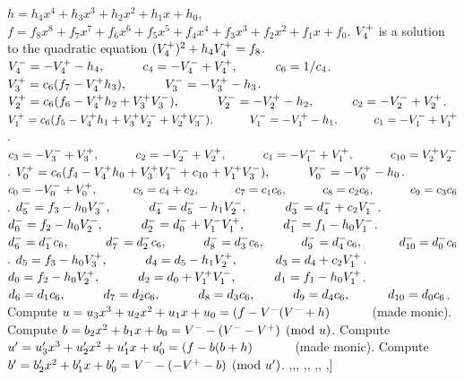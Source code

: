 \begin{algorithm}[htbp]
\caption{Precomputation\label{alg:g3explSPLITpre}}
\begin{algorithmic} [1]
\Require $h = h_4x^4 + h_3x^3 + h_2x^2 + h_1x + h_0$,
\Statex \hspace{23pt}$f = f_8x^8 + f_7x^7 + f_6x^6 + f_5x^5 + f_4x^4 + f_3x^3 + f_2x^2 + f_1x + f_0$.
\algrule
\State $V^{+}_4$ is a solution to the quadratic equation $(V^{+}_4)^2  + h_4V^{+}_4 = f_8$.
\State $V^{-}_4 = -V^{+}_4 - h_4, \quad\quad\quad c_4 = -V^{-}_4 + V^{+}_4, \quad\quad\quad c_6 =1/c_4$.
\State $V^{+}_3 = c_6(f_7 - V^{+}_4h_3), \quad\quad\quad V^{-}_3 = -V^{+}_3 - h_3$.
\State $V^{+}_2 = c_6(f_6 - V^{+}_4h_2 + V^{+}_3V^{-}_3), \quad\quad\quad V^{-}_2 = -V^{+}_2 - h_2, \quad\quad\quad c_2 = -V^{-}_2 + V^{+}_2$.
\State $V^{+}_1 = c_6(f_5 - V^{+}_4h_1 + V^{+}_3V^{-}_2 + V^{+}_2V^{-}_3), \quad\quad\quad V^{-}_1 = -V^{+}_1 - h_1, \quad\quad\quad c_1 = -V^{-}_1 + V^{+}_1$.
\State $c_3 = -V^{-}_3 + V^{+}_3, \quad\quad\quad c_2 = -V^{-}_2 + V^{+}_2, \quad\quad\quad c_1 = -V^{-}_1 + V^{+}_1, \quad\quad\quad c_{10} = V^{+}_2V^{-}_2$.
\State $V^{+}_0 = c_6(f_4 - V^{+}_4h_0 + V^{+}_3V^{-}_1 + c_{10} + V^{+}_1V^{-}_3), \quad\quad\quad V^{-}_0 = -V^{+}_0 - h_0$.
\State $c_0 = -V^{-}_0 + V^{+}_0, \quad\quad\quad c_5 = c_4 + c_2, \quad\quad\quad c_7 = c_1c_6, \quad\quad\quad c_8 = c_2c_6, \quad\quad\quad c_9 = c_3c_6$.
\State $d^{-}_5 = f_3 - h_0V^{-}_3, \quad\quad\quad d^{-}_4 = d^{-}_5 - h_1V^{-}_2, \quad\quad\quad d^{-}_3 = d^{-}_4 + c_2V^{-}_1$.
\State $d^{-}_0 = f_2 - h_0V^{-}_2, \quad\quad\quad d^{-}_2 = d^{-}_0 + V^{-}_1V^{+}_1, \quad\quad\quad d^{-}_1 = f_1 - h_0V^{-}_1$.
\State $d^{-}_6 = d^{-}_1c_6, \quad\quad\quad d^{-}_7 = d^{-}_2c_6, \quad\quad\quad d^{-}_8 = d^{-}_3c_6, \quad\quad\quad d^{-}_9 = d^{-}_4c_6, \quad\quad\quad d^{-}_{10} = d^{-}_0c_6$.
\State $d_5 = f_3 - h_0V^{+}_3, \quad\quad\quad d_4 = d_5 - h_1V^{+}_2, \quad\quad\quad d_3 = d_4 + c_2V^{+}_1$.
\State $d_0 = f_2 - h_0V^{+}_2, \quad\quad\quad d_2 = d_0 + V^{+}_1V^{-}_1, \quad\quad\quad d_1 = f_1 - h_0V^{+}_1$.
\State $d_6 = d_1c_6, \quad\quad\quad d_7 = d_2c_6, \quad\quad\quad d_8 = d_3c_6, \quad\quad\quad d_9 = d_4c_6, \quad\quad\quad d_{10} = d_0c_6$.
\State Compute $u = u_3x^3 + u_2x^2 + u_1x + u_0 = (f - V^{-}(V^{-} +  h) \quad\quad\quad$ (made monic).
\State Compute $b = b_2x^2 + b_1x + b_0 = V^{-} - (V^{-} - V^{+}) \pmod{u}$.
\State Compute $u' = u'_3x^3 + u'_2x^2 + u'_1x + u'_0 = (f - b(b +  h) \quad\quad\quad$ (made monic).
\State Compute $b' = b'_2x^2 + b'_1x + b'_0 = V^{-} - (-V^{+} - b) \pmod{u'}$.
\State \Return [[$f_0,f_1,f_2,f_3,f_4,f_5,f_6,f_7,f_8$],\s[$h_0,h_1,h_2,h_3,h_4$],\s[$\Vp_0,\Vp_1,\Vp_2,\Vp_3,\Vp_4$],
\Statex \hspace{37pt} \s[$\Vn_0,\Vn_1,\Vn_2,\Vn_3,\Vn_4$],\s[$c_0,c_1,c_2,c_3,c_4,c_5,c_6,c_7,c_8,c_9,c_{10}$], 
\Statex \hspace{37pt} \s[$d_0,d_1,d_2,d_3,d_4,d_5,d_6,d_7,d_8,d_9,d_{10}$],\s[$\dn_0,\dn_1,\dn_2,\dn_3,\dn_4,\dn_5,\dn_6,\dn_7,\dn_8,\dn_9,\dn_{10}$],
\Statex \hspace{37pt} \s[$u_0,u_1,u_2,u_3,n,b_0,b_1,b_2$],\s[$u'_0,u'_1,u'_2,u'_3,n',b'_0,b'_1,b'_2$]]
\end{algorithmic}
\end{algorithm}

